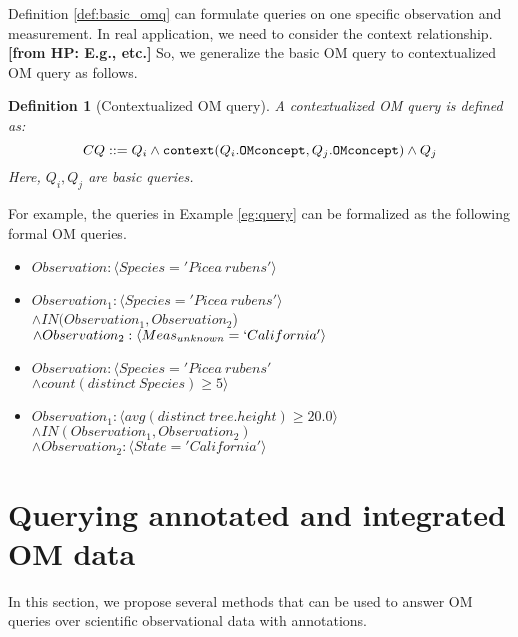 \documentclass[conference]{IEEEtran}
\newtheorem{example}{Example}[section]
\newtheorem{definition}{Definition}[section]
\newcommand{\from}[2]{{\bf[{\sc from #1:} #2]}}
\begin{document}
Definition \ref{def:basic_omq} can formulate queries on
one specific observation and measurement. 
In real application, we need to consider the context relationship. 
\from{HP}{E.g., etc.}
So, we generalize the basic OM query to contextualized OM query as
follows. 

\begin{definition}[Contextualized OM query]\label{def:context_omq} A
  contextualized OM query is defined as:
\[CQ ::=Q_i \wedge {\tt context}(Q_i.{\tt OMconcept}, Q_j.{\tt
  OMconcept})\wedge Q_j\]
Here, $Q_i, Q_j$ are basic queries.
\end{definition}

For example, the queries in Example \ref{eg:query} can be formalized
as the following formal OM queries. 

\begin{itemize}
\item $Observation: \langle Species='Picea~rubens'\rangle$
\item $Observation_1: \langle Species='Picea~rubens'\rangle$\\
  $\wedge IN(Observation_1, Observation_2$) \\
$\wedge Observation_2: \langle Meas_{unknown}=`California'\rangle$
\item $Observation: \langle Species='Picea~rubens'$\\
$\wedge count(distinct~Species)\geq 5\rangle$
\item $Observation_1: \langle avg(distinct~tree.height)\geq 20.0 \rangle$ 
$\wedge IN(Observation_1, Observation_2)$\\
$\wedge Observation_2: \langle State='California'\rangle$\\
\end{itemize}




\section{Querying annotated and integrated OM data}

In this section, we propose several methods that can be used to
answer OM queries over scientific observational data with
annotations. 
\end{document}
